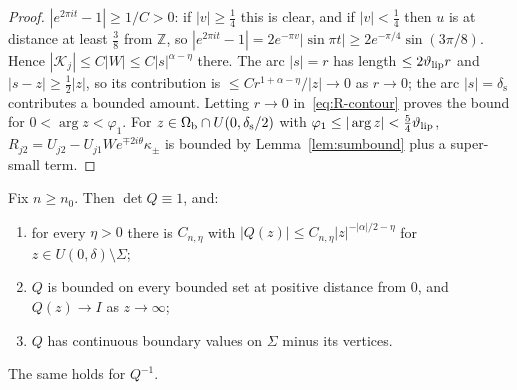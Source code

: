 \begin{proof}
$|e^{2\pi it}-1|\ge1/C>0$: if $|v|\ge\frac14$ this is clear, and if $|v|<\frac14$ then $u$ is at distance at least $\frac38$ from
$\mathbb Z$, so $|e^{2\pi it}-1|=2e^{-\pi v}|\sin\pi t|\ge2e^{-\pi/4}\sin(3\pi/8)$. Hence $|\mathcal K_j|\le C|W|\le C|s|^{\alpha-\eta}$
there. The arc $|s|=r$ has length $\le2\vartheta_{\mathrm{lip}} r$ and $|s-z|\ge\frac12|z|$, so its contribution is $\le Cr^{1+\alpha-\eta}/|z|\to0$
as $r\to0$; the arc $|s|=\delta_{\mathrm s}$ contributes a bounded amount. Letting $r\to0$ in~\eqref{eq:R-contour} proves the bound for
$0<\arg z<\varphi_1$. For $z\in\Omega_{\mathrm{b}}\cap U(0,\delta_{\mathrm s}/2)$ with $\varphi_1\le|\arg z|<\frac54\vartheta_{\mathrm{lip}}$, $R_{j2}=U_{j2}-U_{j1}We^{\mp2i\theta}\kappa_\pm$
is bounded by Lemma~\ref{lem:sumbound} plus a super-small term.
\end{proof}

\begin{proposition}\label{prop:apriori}
Fix $n\ge n_0$. Then $\det Q\equiv1$, and:
\begin{enumerate}
\item[(i)] for every $\eta>0$ there is $C_{n,\eta}$ with $|Q(z)|\le C_{n,\eta}|z|^{-|\alpha|/2-\eta}$ for $z\in U(0,\delta)\setminus\Sigma$;
\item[(ii)] $Q$ is bounded on every bounded set at positive distance from $0$, and $Q(z)\to I$ as $z\to\infty$;
\item[(iii)] $Q$ has continuous boundary values on $\Sigma$ minus its vertices.
\end{enumerate}
The same holds for $Q^{-1}$.
\end{proposition}


